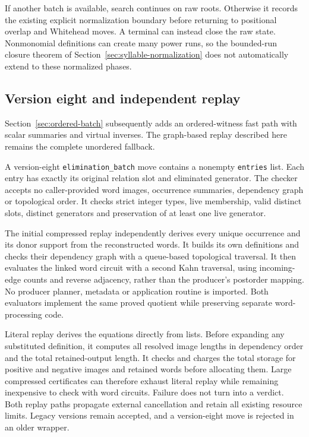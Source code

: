 If another batch is available, search continues on raw roots. Otherwise
it records the existing explicit normalization boundary before returning
to positional overlap and Whitehead moves. A terminal can instead close
the raw state. Nonmonomial definitions can create many power runs, so the
bounded-run closure theorem of Section~\ref{sec:syllable-normalization}
does not automatically extend to these normalized phases.

\subsection{Version eight and independent replay}

Section~\ref{sec:ordered-batch} subsequently adds an ordered-witness fast
path with scalar summaries and virtual inverses. The graph-based replay
described here remains the complete unordered fallback.

A version-eight \texttt{elimination\_batch} move contains a nonempty
\texttt{entries} list. Each entry has exactly its original relation slot
and eliminated generator. The checker accepts no caller-provided word
images, occurrence summaries, dependency graph or topological order.
It checks strict integer types, live membership, valid distinct slots,
distinct generators and preservation of at least one live generator.

The initial compressed replay independently derives every unique occurrence and its
donor support from the reconstructed words. It builds its own definitions
and checks their dependency graph with a queue-based topological traversal.
It then evaluates the linked word circuit with a second Kahn traversal,
using incoming-edge counts and reverse adjacency, rather than the
producer's postorder mapping. No producer planner, metadata or application
routine is imported. Both evaluators implement the same proved quotient
while preserving separate word-processing code.

Literal replay derives the equations directly from lists. Before expanding
any substituted definition, it computes all resolved image lengths in
dependency order and the total retained-output length. It checks and charges
the total storage for positive and negative images and retained words before
allocating them. Large compressed certificates can therefore exhaust literal
replay while remaining inexpensive to check with word circuits. Failure
does not turn into a verdict. Both replay paths propagate external
cancellation and retain all existing resource limits. Legacy versions
remain accepted, and a version-eight move is rejected in an older wrapper.

